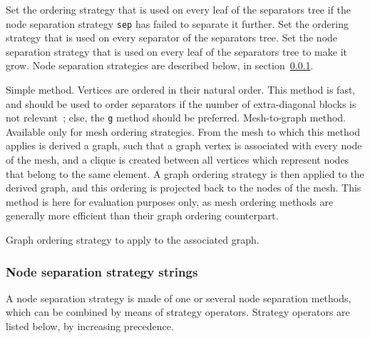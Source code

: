 \begin{itemize}
\begin{itemize}
\iteme[{\tt ole=}{\it strat}]
Set the ordering strategy that is used on every leaf of the separators tree
if the node separation strategy {\tt sep} has failed to separate it further.
\iteme[{\tt ose=}{\it strat}]
Set the ordering strategy that is used on every separator of the separators
tree.
\iteme[{\tt sep=}{\it strat}]
Set the node separation strategy that is used on every leaf of the
separators tree to make it grow. Node separation strategies are
described below, in section~\ref{sec-lib-format-nsep}.
\end{itemize}
\iteme[{\tt s}]
Simple method. Vertices are ordered in their natural order. This
method is fast, and should be used to order separators if the number
of extra-diagonal blocks is not relevant~; else, the {\tt g} method
should be preferred.
\iteme[{\tt v}]
Mesh-to-graph method. Available only for mesh ordering strategies.
From the mesh to which this method applies is derived a graph,
such that a graph vertex is associated with every node of the
mesh, and a clique is created between all vertices which represent
nodes that belong to the same element. A graph ordering strategy is
then applied to the derived graph, and this ordering is projected
back to the nodes of the mesh. This method is here for evaluation
purposes only, as mesh ordering methods are generally more
efficient than their graph ordering counterpart.
\begin{itemize}
\iteme[{\tt strat=}{\it strat}]
Graph ordering strategy to apply to the associated graph.
\end{itemize}
\end{itemize}

\subsubsection{Node separation strategy strings}
\label{sec-lib-format-nsep}

A node separation strategy is made of one or several node separation
methods, which can be combined by means of strategy
operators. Strategy operators are listed below, by increasing
precedence.

